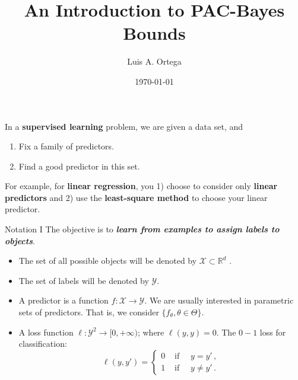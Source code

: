 \documentclass[aspectratio=159]{beamer}
\title{An Introduction to PAC-Bayes Bounds}
\date{\today}
\author{Luis A. Ortega}
\institute{Universidad Autónoma de Madrid}
\begin{document}
    \maketitle


    \begin{frame}{}
        In a \textbf{supervised learning} problem, we are given a data set, and 
        \begin{enumerate}
            \item Fix a family of predictors.
            \item Find a good predictor in this set.
        \end{enumerate}
        \pause
        For example, for \textbf{linear regression}, you 1) choose to consider only \textbf{linear predictors} and 2) use the \textbf{least-square method} to choose your linear predictor.
    \end{frame}

    \begin{frame}{Notation I}
        The objective is to \textit{\textbf{learn from examples to assign labels to objects}}. \pause
        \begin{itemize}[<+->]
            \item The set of all possible objects will be denoted by \(\mathcal{X} \subset \mathbb{R}^d\) . 
            \item The set of labels will be denoted by \(\mathcal{Y}\).
            \item A predictor is a function \(f : \mathcal{X} \to \mathcal{Y}\). We are usually interested in parametric sets of predictors. That is, we consider \(\{f_{\theta}, \theta \in \Theta\}\).
            \item A loss function \(\ell : \mathcal{Y}^2 \to [0, + \infty)\); where \(\ell(y, y) = 0 \).
            The \(0-1\) loss for classification:
            \[
                \ell(y, y') = \begin{cases}
                    0 & \text{ if } \quad y = y'\,,\\
                    1 & \text{ if } \quad y \neq y'\,.
                \end{cases}
            \]
        \end{itemize}
    \end{frame}
\end{document}
